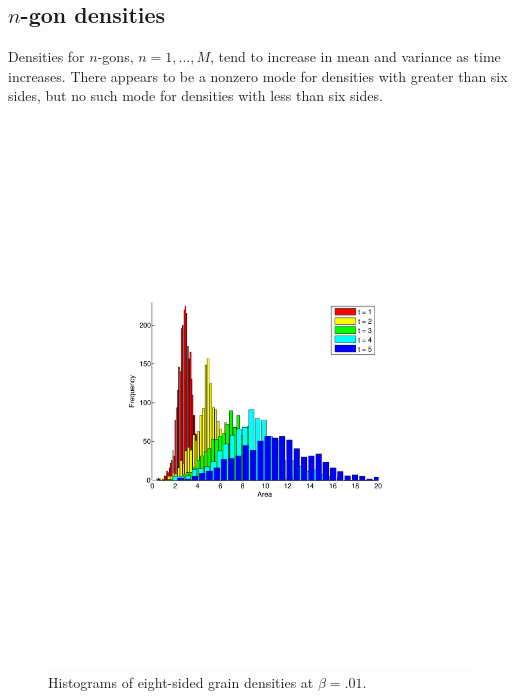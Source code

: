 \documentclass{amsart}
\begin{document}
\subsection{$n$-gon densities}
Densities for $n$-gons, $n = 1, \dots, M$,  tend to increase in mean and variance as time increases. There appears to be a nonzero mode for densities with greater than six sides, but no such mode for densities with less than six sides.
\begin{figure}
\includegraphics[width=\textwidth]{histbetazerotier8.pdf}
\vspace{-130pt}
\caption{Histograms of eight-sided grain densities at $\beta = .01$.}
\end{figure}
\end{document}
